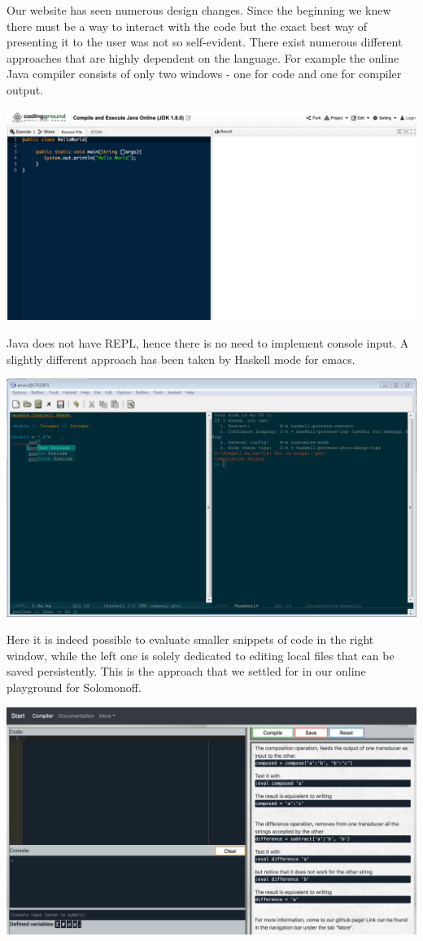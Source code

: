 Our website has seen numerous design changes. Since the beginning we knew there must be a way to interact with the code but the exact best way of presenting it to the user was not so self-evident. There exist numerous different approaches that are highly dependent on the language. For example the online  Java  compiler consists of only two windows - one for code and one for compiler output.
\begin{center}
\includegraphics[scale=0.3]{java.png}
\end{center}
Java does not have REPL, hence there is no need to implement console input.
A slightly different approach has been taken by Haskell mode for emacs. 
\begin{center}
     \includegraphics[scale=0.45]{haskell.png}
\end{center}
Here it is indeed possible to evaluate smaller snippets of code in the right window, while the left one is solely dedicated to editing local files that can be saved persistently. This is the approach that we settled for in our online playground for Solomonoff. 
\begin{center}
     \includegraphics[scale=0.3]{web8.png}
\end{center}
